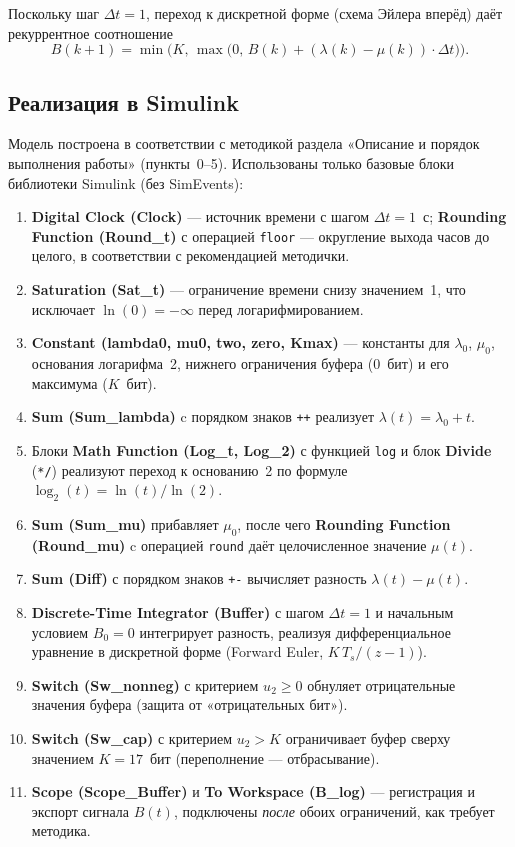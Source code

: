 \documentclass[a4paper,12pt]{article}
\begin{document}
Поскольку шаг $\Delta t = 1$, переход к дискретной форме (схема Эйлера вперёд)
даёт рекуррентное соотношение
\[
B(k+1) = \min\!\bigl(K,\, \max\!\bigl(0,\, B(k) + (\lambda(k) - \mu(k))\cdot \Delta t\bigr)\bigr).
\]

\subsection*{Реализация в Simulink}
Модель построена в соответствии с методикой раздела «Описание и порядок выполнения работы»
(пункты~0--5). Использованы только базовые блоки библиотеки Simulink (без SimEvents):

\begin{enumerate}
    \item \textbf{Digital Clock (Clock)} --- источник времени с шагом $\Delta t = 1$~с;
          \textbf{Rounding Function (Round\_t)} с операцией \texttt{floor} --- округление
          выхода часов до целого, в соответствии с рекомендацией методички.
    \item \textbf{Saturation (Sat\_t)} --- ограничение времени снизу значением~1, что
          исключает $\ln(0)=-\infty$ перед логарифмированием.
    \item \textbf{Constant (lambda0, mu0, two, zero, Kmax)} --- константы для
          $\lambda_{0}$, $\mu_{0}$, основания логарифма~2, нижнего ограничения буфера
          (0~бит) и его максимума ($K$~бит).
    \item \textbf{Sum (Sum\_lambda)} c порядком знаков \texttt{++} реализует
          $\lambda(t)=\lambda_{0}+t$.
    \item Блоки \textbf{Math Function (Log\_t, Log\_2)} с функцией \texttt{log}
          и блок \textbf{Divide} (\texttt{*/}) реализуют переход к основанию~2 по формуле
          $\log_{2}(t)=\ln(t)/\ln(2)$.
    \item \textbf{Sum (Sum\_mu)} прибавляет $\mu_{0}$, после чего
          \textbf{Rounding Function (Round\_mu)} c операцией \texttt{round} даёт
          целочисленное значение $\mu(t)$.
    \item \textbf{Sum (Diff)} с порядком знаков \texttt{+-} вычисляет разность
          $\lambda(t)-\mu(t)$.
    \item \textbf{Discrete-Time Integrator (Buffer)} с шагом $\Delta t=1$ и начальным
          условием $B_{0}=0$ интегрирует разность, реализуя дифференциальное уравнение
          в дискретной форме (Forward Euler, $K\,T_{s}/(z-1)$).
    \item \textbf{Switch (Sw\_nonneg)} с критерием $u_{2}\geqslant 0$ обнуляет
          отрицательные значения буфера (защита от «отрицательных бит»).
    \item \textbf{Switch (Sw\_cap)} с критерием $u_{2}>K$ ограничивает буфер сверху
          значением $K=17$~бит (переполнение --- отбрасывание).
    \item \textbf{Scope (Scope\_Buffer)} и \textbf{To Workspace (B\_log)} ---
          регистрация и экспорт сигнала $B(t)$, подключены \emph{после} обоих
          ограничений, как требует методика.
\end{enumerate}
\end{document}
